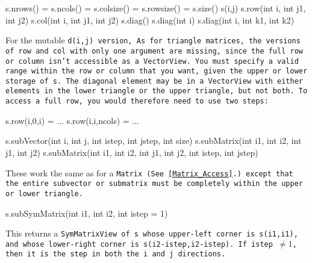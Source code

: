\begin{tmvcode}
s.nrows() = s.ncols() = s.colsize() = s.rowsize() = s.size()
s(i,j)
s.row(int i, int j1, int j2)
s.col(int i, int j1, int j2)
s.diag()
s.diag(int i)
s.diag(int i, int k1, int k2)
\end{tmvcode}
For the mutable \tt{d(i,j)} version, 
As for triangle matrices, the versions of \tt{row} and \tt{col} with only one argument are
missing, since the full row or column isn't accessible as a \tt{VectorView}.
You must specify a valid range within the row or column that you want, 
given the upper or lower storage of \tt{s}.
The diagonal element may be in a \tt{VectorView} with either elements in the 
lower triangle or the upper triangle, but not both.  To access a full row, you would 
therefore need to use two steps:
\begin{tmvcode}
s.row(i,0,i) = ...
s.row(i,i,ncols) = ...
\end{tmvcode}

\begin{tmvcode}
s.subVector(int i, int j, int istep, int jstep, int size)
s.subMatrix(int i1, int i2, int j1, int j2)
s.subMatrix(int i1, int i2, int j1, int j2, int istep, int jstep)
\end{tmvcode}
These work the same as for a \tt{Matrix}
(See \ref{Matrix_Access}.)
except that the entire
subvector or submatrix must be completely within the upper or lower triangle.

\begin{tmvcode}
s.subSymMatrix(int i1, int i2, int istep = 1)
\end{tmvcode}
This returns a \tt{SymMatrixView} of \tt{s} whose upper-left
corner is \tt{s(i1,i1)}, and whose lower-right corner is 
\tt{s(i2-istep,i2-istep)}.  If \tt{istep} $\neq 1$, then it is the 
step in both the \tt{i} and \tt{j} directions.

